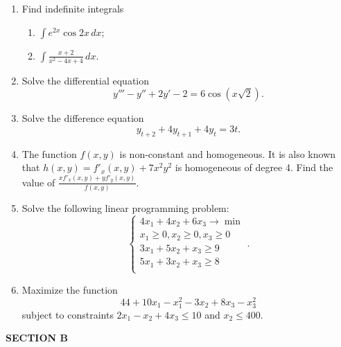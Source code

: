 \documentclass[12pt,a4paper]{article}
\begin{document}
\begin{enumerate}

\item Find indefinite integrals
\begin{enumerate}
  \item  $\int {{e^{2x}}\cos 2x \, dx}$;
  \item  $\int {\frac{{x + 2}}{{{x^2} - 4x + 4}} \, dx}$.
\end{enumerate}

\item Solve the differential equation
\[
y''' - y'' + 2y' - 2 = 6\cos (x\sqrt 2 ).
\]

\item Solve the difference equation
\[
{y_{t + 2}} + 4{y_{t + 1}} + 4{y_t} = 3t.
\]

\item The function $f(x, y)$ is non-constant and homogeneous. It is also known that $h(x, y) = f'_x(x, y) + 7x^2y^2$ is homogeneous of degree 4. Find the value of $\frac{xf'_x(x, y) + yf'_y(x, y)}{f(x, y)}$.

\item Solve the following linear programming problem:
\[
\begin{cases}
4x_1 + 4x_2 + 6x_3 \to \min \\
x_1 \geq 0, x_2 \geq 0, x_3 \geq 0 \\
3x_1 + 5x_2 + x_3 \geq 9 \\
5x_1 + 3x_2 + x_3 \geq 8 \\
\end{cases}.
\]

\item Maximize the function
\[
44 + 10x_1 - x_1^2 -3x_2 + 8x_3 - x_3^2
\]
subject to constraints $2x_1 -x_2+4x_3 \leq 10$ and $x_2 \leq 400$.

\end{enumerate}

\textbf{SECTION B}
\end{document}

